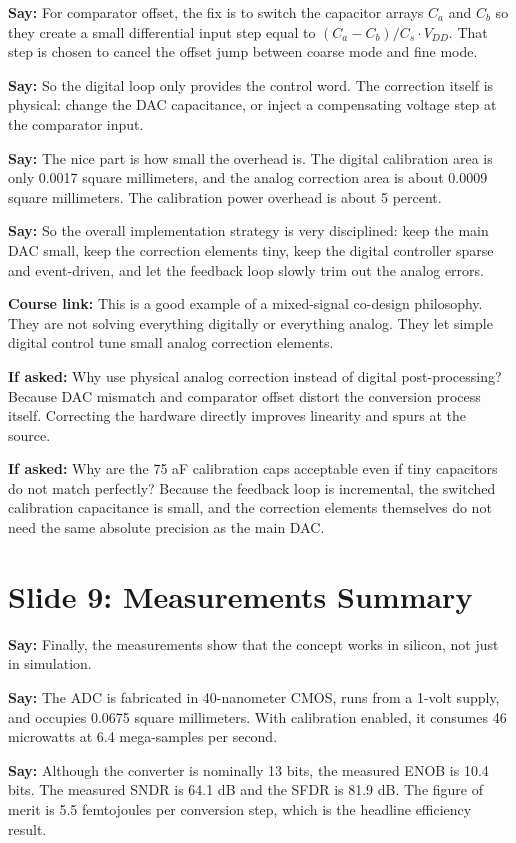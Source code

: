 \documentclass[11pt]{article}
\newcommand{\speak}[1]{\textbf{Say:} #1}
\newcommand{\ifasked}[1]{\textbf{If asked:} #1}
\newcommand{\course}[1]{\textbf{Course link:} #1}
\begin{document}
\speak{For comparator offset, the fix is to switch the capacitor arrays $C_a$ and $C_b$ so they create a small differential input step equal to $(C_a-C_b)/C_s \cdot V_{DD}$. That step is chosen to cancel the offset jump between coarse mode and fine mode.}

\speak{So the digital loop only provides the control word. The correction itself is physical: change the DAC capacitance, or inject a compensating voltage step at the comparator input.}

\speak{The nice part is how small the overhead is. The digital calibration area is only 0.0017 square millimeters, and the analog correction area is about 0.0009 square millimeters. The calibration power overhead is about 5 percent.}

\speak{So the overall implementation strategy is very disciplined: keep the main DAC small, keep the correction elements tiny, keep the digital controller sparse and event-driven, and let the feedback loop slowly trim out the analog errors.}

\course{This is a good example of a mixed-signal co-design philosophy. They are not solving everything digitally or everything analog. They let simple digital control tune small analog correction elements.}

\ifasked{Why use physical analog correction instead of digital post-processing? Because DAC mismatch and comparator offset distort the conversion process itself. Correcting the hardware directly improves linearity and spurs at the source.}

\ifasked{Why are the 75 aF calibration caps acceptable even if tiny capacitors do not match perfectly? Because the feedback loop is incremental, the switched calibration capacitance is small, and the correction elements themselves do not need the same absolute precision as the main DAC.}

\section*{Slide 9: Measurements Summary}
\speak{Finally, the measurements show that the concept works in silicon, not just in simulation.}

\speak{The ADC is fabricated in 40-nanometer CMOS, runs from a 1-volt supply, and occupies 0.0675 square millimeters. With calibration enabled, it consumes 46 microwatts at 6.4 mega-samples per second.}

\speak{Although the converter is nominally 13 bits, the measured ENOB is 10.4 bits. The measured SNDR is 64.1 dB and the SFDR is 81.9 dB. The figure of merit is 5.5 femtojoules per conversion step, which is the headline efficiency result.}
\end{document}
